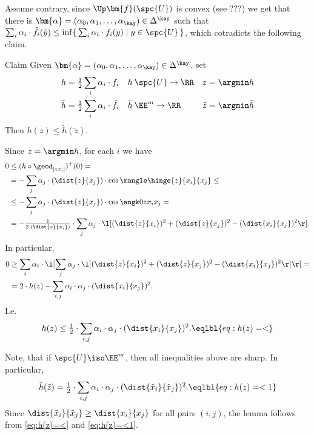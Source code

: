 {Assume contrary, since $\Up\bm{f}(\spc{U})$ is convex (see ???)
we get that there is $\bm{\alpha}=(\alpha_0,\alpha_1,\dots,\alpha_\kay)\in\Delta^\kay$ such that $\sum_i\alpha_i\cdot\tilde f_i(\tilde y)\le \inf\{\,\sum_i\alpha_i\cdot f_i(y)\mid y\in\spc{U}\,\}$, which cotradicts the following claim. 

\begin{clm}{Claim}
Given $\bm{\alpha}=(\alpha_0,\alpha_1,\dots,\alpha_\kay)\in\Delta^\kay$,
set
\begin{align*}
&h=\tfrac12\sum_i\alpha_i\cdot f_i
&
&h\:\spc{U}\to\RR
&
&z=\argmin h
\\
&\tilde h=\tfrac12\sum_i\alpha_i\cdot \tilde f_i
&
&\tilde h\:\EE^m\to\RR
&
&\tilde z=\argmin \tilde h
\end{align*}
Then 
$h(z)\le \tilde h(\tilde z)$.
\end{clm}

Since $z=\argmin h$, for each $i$ we have
\begin{align*}
0
&\le 
(h\circ\geod_{[zx_i]})^+(0)=
\\
&=
-\sum_j\alpha_j\cdot(\dist{z}{x_j})\cdot\cos\mangle\hinge{z}{x_i}{x_j}
\le
\\
&\le
-\sum_j\alpha_j\cdot(\dist{z}{x_j})\cdot\cos\angk0{z}{x_i}{x_j}
=
\\
&=
-\tfrac{1}{2\cdot(\dist{z}{x_i})}
\cdot 
\sum_j
\alpha_j\cdot\l[(\dist{z}{x_i})^2+(\dist{z}{x_j})^2-(\dist{x_i}{x_j})^2\r].
\end{align*}
In particular,
\begin{align*}
0&\ge 
\sum_{i}\alpha_i\cdot\l[\sum_j
\alpha_j
\cdot
\l[(\dist{z}{x_i})^2+(\dist{z}{x_j})^2-(\dist{x_i}{x_j})^2\r]\r]
=
\\
&=2\cdot h(z)-
\sum_{i,j}
\alpha_i\cdot\alpha_j
\cdot
(\dist{x_i}{x_j})^2.
\end{align*}
I.e.
$$h(z)\le
\tfrac{1}{2}\cdot
\sum_{i,j}
\alpha_i\cdot\alpha_j
\cdot
(\dist{x_i}{x_j})^2. \eqlbl{eq:h(z)=<}$$

Note, that if $\spc{U}\iso\EE^m$, then all inequalities above are sharp.
In particular, 
$$\tilde h(\tilde z)=
\tfrac{1}{2}\cdot
\sum_{i,j}
\alpha_i\cdot\alpha_j
\cdot
(\dist{\tilde x_i}{\tilde x_j})^2. \eqlbl{eq:h(z)=<1}$$
Since $\dist{\tilde x_i}{\tilde x_j}\ge\dist{x_i}{x_j}$ for all pairs $(i,j)$,
the lemma follows from \ref{eq:h(z)=<} and \ref{eq:h(z)=<1}.
\qeds












}
